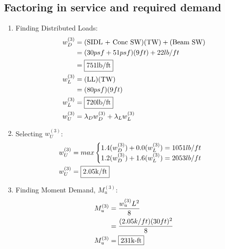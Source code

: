 \documentclass{report} %
\begin{document}
\subsection*{Factoring in service and required demand}
\begin{enumerate}
    \item Finding Distributed Loads:
        \begin{equation*}
            \begin{aligned}
                w^{(3)}_D   &= (\text{SIDL + Conc SW}) (\text{TW}) + (\text{Beam SW}) \\
                            &= (30psf + 51 psf)(9ft) + 22lb/ft \\
                            &= \framebox{751lb/ft} \\
                w^{(3)}_L &= (\text{LL}) (\text{TW}) \\
                            &= (80psf)(9ft) \\
                w^{(3)}_L &= \framebox{720lb/ft} \\
                w^{(3)}_U   &= \lambda _D w^{(3)}_D + \lambda _L w^{(3)}_L \\
            \end{aligned}
        \end{equation*}
    \item Selecting $w^{(3)}_U$:
    \begin{equation*}
        \begin{aligned}
            w^{(3)}_U &= max
                \begin{cases}
                    1.4(w^{(3)}_D) + 0.0(w^{(3)}_L) = 1051lb/ft \\
                    1.2(w^{(3)}_D) + 1.6(w^{(3)}_L) = 2053lb/ft \\
                \end{cases} \\
            w^{(3)}_U &= \framebox{2.05k/ft}
        \end{aligned}
    \end{equation*}
    \item Finding Moment Demand, $M^{(3)}_u$:
        \begin{equation*}
            \begin{aligned}
                M^{(3)}_u   &= \frac{{w^{(3)}_u}L^2}{8} \\
                            &= \frac{(2.05k/ft)(30ft)^2}{8} \\
                M^{(3)}_u   &= \framebox{231k-ft}
            \end{aligned}

\end{equation*}
\end{enumerate}
\end{document}
